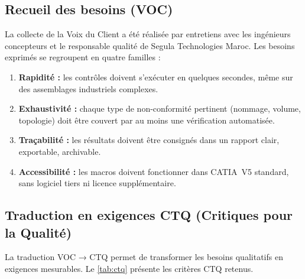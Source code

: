 \subsection{Recueil des besoins (VOC)}

La collecte de la Voix du Client a été réalisée par entretiens avec les ingénieurs concepteurs et le responsable qualité de Segula Technologies Maroc. Les besoins exprimés se regroupent en quatre familles :

\begin{enumerate}
    \item \textbf{Rapidité :} les contrôles doivent s'exécuter en quelques secondes, même sur des assemblages industriels complexes.
    \item \textbf{Exhaustivité :} chaque type de non-conformité pertinent (nommage, volume, topologie) doit être couvert par au moins une vérification automatisée.
    \item \textbf{Traçabilité :} les résultats doivent être consignés dans un rapport clair, exportable, archivable.
    \item \textbf{Accessibilité :} les macros doivent fonctionner dans CATIA~V5 standard, sans logiciel tiers ni licence supplémentaire.
\end{enumerate}

\subsection{Traduction en exigences CTQ (Critiques pour la Qualité)}

La traduction VOC → CTQ permet de transformer les besoins qualitatifs en exigences mesurables. Le \autoref{tab:ctq} présente les critères CTQ retenus.

